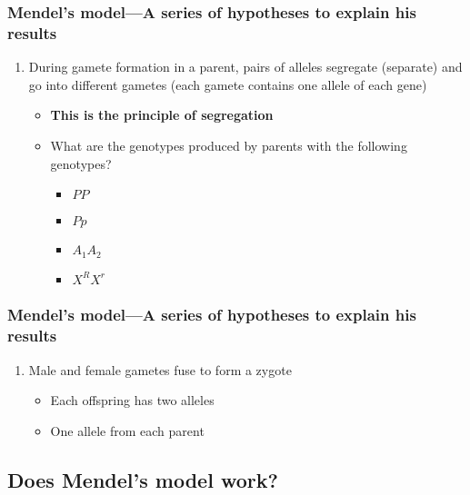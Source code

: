 \begin{frame}
    \frametitle{Mendel's model---A series of hypotheses to explain his results}
    \begin{enumerate}[<+->]
        \item During gamete formation in a parent, pairs of alleles segregate
            (separate) and go into different gametes (each gamete contains one
            allele of each gene)
            \begin{itemize}
                \item \textbf{This is the principle of segregation}
                \item What are the  genotypes produced
                    by parents with the following genotypes?
                    \begin{itemize}
                        \item $PP$ 
                        \item $Pp$ 
                        \item $A_{1}A_{2}$ 
                        \item $X^{R}X^{r}$ 
                    \end{itemize}
            \end{itemize}
    \end{enumerate}
\end{frame}

\begin{frame}
    \frametitle{Mendel's model---A series of hypotheses to explain his results}
    \begin{enumerate}[<+->]
        \item Male and female gametes fuse to form a zygote
            \begin{itemize}
                \item Each offspring has two alleles
                \item One allele from each parent
            \end{itemize}
    \end{enumerate}
\end{frame}

\subsection{Does Mendel's model work?}

